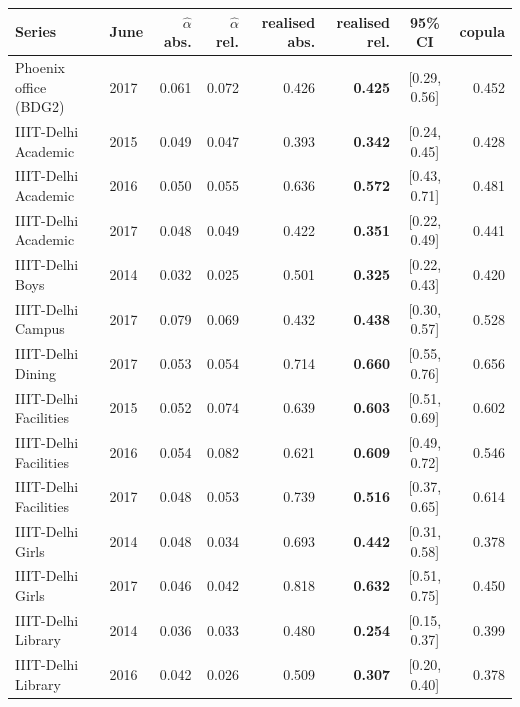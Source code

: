\begin{table}[t]
\centering
\footnotesize
\setlength{\tabcolsep}{3.5pt}
\begin{tabular}{llrrrrcr}
\toprule
Series & June & $\hat\alpha$ abs. & $\hat\alpha$ rel. & realised abs. & realised rel. & 95\% CI & copula \\
\midrule
Phoenix office (BDG2) & 2017 & 0.061 & 0.072 & 0.426 & \textbf{0.425} & [0.29, 0.56] & 0.452 \\
\midrule
IIIT-Delhi Academic & 2015 & 0.049 & 0.047 & 0.393 & \textbf{0.342} & [0.24, 0.45] & 0.428 \\
IIIT-Delhi Academic & 2016 & 0.050 & 0.055 & 0.636 & \textbf{0.572} & [0.43, 0.71] & 0.481 \\
IIIT-Delhi Academic & 2017 & 0.048 & 0.049 & 0.422 & \textbf{0.351} & [0.22, 0.49] & 0.441 \\
IIIT-Delhi Boys & 2014 & 0.032 & 0.025 & 0.501 & \textbf{0.325} & [0.22, 0.43] & 0.420 \\
IIIT-Delhi Campus & 2017 & 0.079 & 0.069 & 0.432 & \textbf{0.438} & [0.30, 0.57] & 0.528 \\
IIIT-Delhi Dining & 2017 & 0.053 & 0.054 & 0.714 & \textbf{0.660} & [0.55, 0.76] & 0.656 \\
IIIT-Delhi Facilities & 2015 & 0.052 & 0.074 & 0.639 & \textbf{0.603} & [0.51, 0.69] & 0.602 \\
IIIT-Delhi Facilities & 2016 & 0.054 & 0.082 & 0.621 & \textbf{0.609} & [0.49, 0.72] & 0.546 \\
IIIT-Delhi Facilities & 2017 & 0.048 & 0.053 & 0.739 & \textbf{0.516} & [0.37, 0.65] & 0.614 \\
IIIT-Delhi Girls & 2014 & 0.048 & 0.034 & 0.693 & \textbf{0.442} & [0.31, 0.58] & 0.378 \\
IIIT-Delhi Girls & 2017 & 0.046 & 0.042 & 0.818 & \textbf{0.632} & [0.51, 0.75] & 0.450 \\
IIIT-Delhi Library & 2014 & 0.036 & 0.033 & 0.480 & \textbf{0.254} & [0.15, 0.37] & 0.399 \\
IIIT-Delhi Library & 2016 & 0.042 & 0.026 & 0.509 & \textbf{0.307} & [0.20, 0.40] & 0.378 \\
\bottomrule
\end{tabular}

\end{table}
